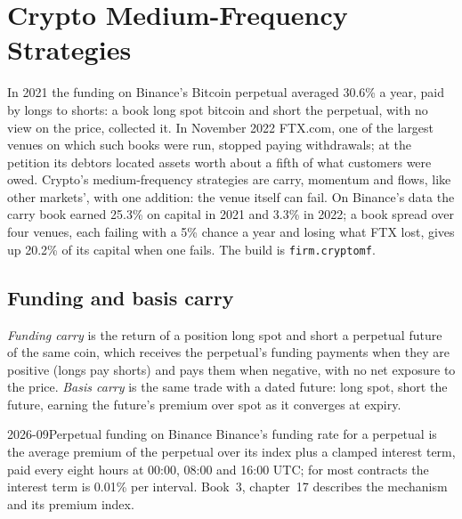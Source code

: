 \chapter{Crypto Medium-Frequency Strategies}\label{ch:s1:crypto-medium-frequency-strategies}

In 2021 the funding on Binance's Bitcoin perpetual averaged 30.6\% a year, paid by longs to shorts: a book long spot bitcoin and short the perpetual,
with no view on the price, collected it. In November 2022 FTX.com, one of the largest venues on which such books were run, stopped paying withdrawals;
at the petition its debtors located assets worth about a fifth of what customers were owed. Crypto's medium-frequency strategies are carry, momentum
and flows, like other markets', with one addition: the venue itself can fail. On Binance's data the carry book earned 25.3\% on capital in 2021 and
3.3\% in 2022; a book spread over four venues, each failing with a 5\% chance a year and losing what FTX lost, gives up 20.2\% of its capital when one
fails. The build is \texttt{firm.cryptomf}.

\section{Funding and basis carry}

\begin{definition}\label{def:s1:crypto-medium-frequency-strategies:carry}
\emph{Funding carry} is the return of a position long spot and short a perpetual future of the same coin, which receives the
perpetual's funding payments when they are positive (longs pay shorts) and pays them when negative, with no net exposure to the price. \emph{Basis
carry} is the same trade with a dated future: long spot, short the future, earning the future's premium over spot as it converges
at expiry.
\end{definition}

\begin{dated}{2026-09}{Perpetual funding on Binance}\label{dat:s1:crypto-medium-frequency-strategies:funding}
Binance's funding rate for a perpetual is the average premium of the perpetual over its index plus a clamped interest term, paid every eight hours at
00:00, 08:00 and 16:00 UTC; for most contracts the interest term is 0.01\% per interval. Book~3, chapter~17 describes the mechanism and its premium
index.
\end{dated}

